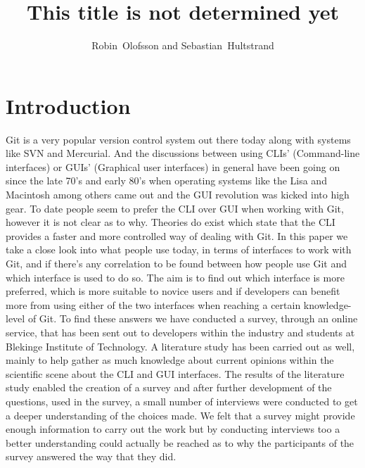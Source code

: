 \documentclass[12pt,a4paper,article,compsoc]{IEEEtran}
\begin{document}
	\title{This title is not determined yet}
	\author{Robin~Olofsson and Sebastian~Hultstrand}
	
		
		\maketitle
		
		\section{Introduction}
		Git is a very popular version control system out there today along with systems like SVN and Mercurial. And the discussions between using CLIs' (Command-line interfaces) or GUIs' (Graphical user interfaces) in general have been going on since the late 70's and early 80's when operating systems like the Lisa and Macintosh among others came out \cite{HistoryOfGUIWiki} and the GUI revolution was kicked into high gear.
		To date people seem to prefer the CLI over GUI when working with Git, however it is not clear as to why.
		Theories do exist which state that the CLI provides a faster and more controlled way of dealing with Git. \cite{GitUserSurvey}\cite{GitInClassroom}
		In this paper we take a close look into what people use today, in terms of interfaces to work with Git, and if there's any correlation to be found between how people use Git and which interface is used to do so.
		The aim is to find out which interface is more preferred, which is more suitable to novice users and if developers can benefit more from using either of the two interfaces when reaching a certain knowledge-level of Git.
		To find these answers we have conducted a survey, through an online service, that has been sent out to developers within the industry and students at Blekinge Institute of Technology.
		A literature study has been carried out as well, mainly to help  gather as much knowledge about current opinions within the scientific scene about the CLI and GUI interfaces.
		The results of the literature study enabled the creation of a  survey and after further development of the questions, used in the survey, a small number of interviews were conducted to get a deeper understanding of the choices made.
		We felt that a survey might provide enough information to carry out the work but by conducting interviews too a better understanding could actually be reached as to why the participants of the survey answered the way that they did.
		
\end{document}

